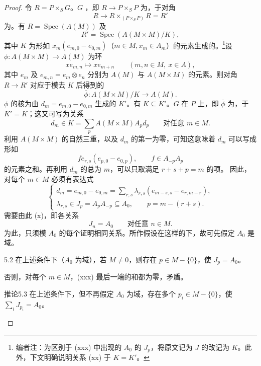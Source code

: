 \begin{proof}
令 $R=P\times_SG$。$G$ ，即 $R\to P\times_SP$ 为，于对角
\[
R\longrightarrow R\times_{(P\times_SP)}R=R'
\]
为。有 $R=\operatorname{Spec}(A(M))$ 及
\[
R'=\operatorname{Spec}(A(M\times M)/K),
\]
其中 $K$ 为形如 $x_m(e_{m,0}-e_{0,m})$（$m\in M,x_m\in A_m$）的元素生成的。\footnote[19]{编者注：为区别于 (xxx) 中出现的 $A_0$ 的 $J_p$，将原文记为 $J$ 的改记为 $K$。此外，下文明确说明关系 (xx) 于 $K=K'$。}设 $\phi:A(M\times M)\to A(M)$ 为环
\[
x e_{m,n}\longmapsto x e_{m+n}\qquad(m,n\in M,\ x\in A),
\]
其中 $e_m$ 及 $e_{m,n}=e_m\otimes e_n$ 分别为 $A(M)$ 与 $A(M\times M)$ 的元素。则对角 $R\to R'$ 对应于模去 $K$ 后得到的
\[
\overline\phi:A(M\times M)/K\longrightarrow A(M).
\]
$\phi$ 的核为由 $d_m=e_{m,0}-e_{0,m}$ 生成的 $K'$。有 $K\subseteq K'$。$G$ 在 $P$ 上，即 $\overline\phi$ 为，于 $K'=K$；这又可写为关系
\[
d_m\in K=\sum_p A(M\times M)A_p d_p\qquad\text{对任意 }m\in M.\tag{xx}
\]
利用 $A(M\times M)$ 的自然三重，以及 $d_m$ 的第一为零，可知这意味着 $d_m$ 可以写成形如
\[
f e_{r,s}(e_{p,0}-e_{0,p}),\qquad f\in A_{-p}A_p
\]
的元素之和。再利用 $d_m$ 的总为 $m$，可以只取满足 $r+s+p=m$ 的项。
因此，对每个 $m\in M$ 必须有表达式
\[
\begin{cases}
d_m=e_{m,0}-e_{0,m}=\displaystyle\sum_{r,s}\lambda_{r,s}(e_{m-s,s}-e_{r,m-r}),\\
\lambda_{r,s}\in J_p=A_pA_{-p}\subseteq A_0,\qquad p=m-(r+s).
\end{cases}\tag{xxx}
\]
需要由此 (x)，即各关系
\[
J_n=A_0\qquad\text{对任意 }n\in M.\tag{xxxx}
\]
为此，只须模 $A_0$ 的每个证明相同关系。所作假设在这样的下，故可先假定 $A_0$ 是域。
\begin{SGAresult}{}{5.2}
在上述条件下（$A_0$ 为域），若 $M\ne0$，则存在 $p\in M-\{0\}$，使 $J_p=A_0$。
\end{SGAresult}
否则，对每个 $m\in M$，(xxx) 最后一端的和都为零，矛盾。
\begin{SGAresult}{推论}{5.3}
在上述条件下，但不再假定 $A_0$ 为域，存在多个 $p_i\in M-\{0\}$，使 $\sum_iJ_{p_i}=A_0$。

\end{SGAresult}
\end{proof}
